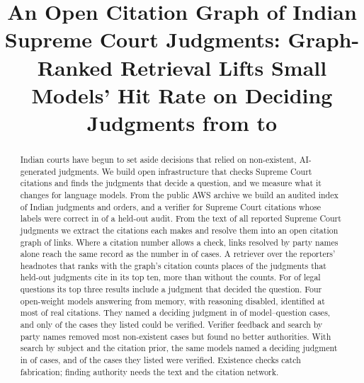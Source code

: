 \documentclass[conference]{IEEEtran}
\begin{document}
\title{An Open Citation Graph of \GraphTextOK{} Indian Supreme Court Judgments: Graph-Ranked Retrieval Lifts Small Models' Hit Rate on Deciding Judgments from \RefRateClosed{} to \RefRateTopicPrior}

\author{
}

\maketitle

\begin{abstract}
Indian courts have begun to set aside decisions that relied on non-existent, AI-generated judgments. We build open infrastructure that checks Supreme Court citations and finds the judgments that decide a question, and we measure what it changes for language models. From the public AWS archive we build an audited index of \CorpusTotal{} Indian judgments and orders, and a verifier for Supreme Court citations whose labels were correct in \AuditPct{} of a held-out audit. From the text of all \GraphTextOK{} reported Supreme Court judgments we extract the citations each makes and resolve them into an open citation graph of \GraphEdges{} links. Where a citation number allows a check, links resolved by party names alone reach the same record as the number in \GraphNameSamePct{} of cases. A retriever over the reporters' headnotes that ranks with the graph's citation counts places \RecHybridPriorRTenPct{} of the judgments that \RecNTest{} held-out judgments cite in its top ten, \RecPriorRelGain{} more than without the counts. For \QHybridPriorHitThree{} of \NumTopics{} legal questions its top three results include a judgment that decided the question. Four open-weight models answering from memory, with reasoning disabled, identified at most \BestTOneCorrect{} of \TOneN{} real citations. They named a deciding judgment in \RefAllClosed{} of \RefQuestionsAll{} model--question cases, and only \VerPctAllClosed{} of the cases they listed could be verified. Verifier feedback and search by party names removed most non-existent cases but found no better authorities. With search by subject and the citation prior, the same models named a deciding judgment in \RefAllTopicPrior{} of \RefQuestionsAll{} cases, and \VerPctAllTopicPrior{} of the cases they listed were verified. Existence checks catch fabrication; finding authority needs the text and the citation network.
\end{abstract}
\end{document}
